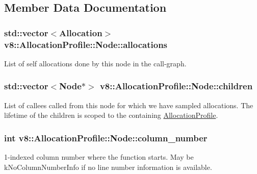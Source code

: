 \subsection{Member Data Documentation}
\subsubsection[{\texorpdfstring{allocations}{allocations}}]{\setlength{\rightskip}{0pt plus 5cm}std\+::vector$<${\bf Allocation}$>$ v8\+::\+Allocation\+Profile\+::\+Node\+::allocations}\hypertarget{structv8_1_1_allocation_profile_1_1_node_a6ee0934b35ba77fb5d8b53f02d5a3068}{}\label{structv8_1_1_allocation_profile_1_1_node_a6ee0934b35ba77fb5d8b53f02d5a3068}
List of self allocations done by this node in the call-\/graph. 
\subsubsection[{\texorpdfstring{children}{children}}]{\setlength{\rightskip}{0pt plus 5cm}std\+::vector$<${\bf Node}$\ast$$>$ v8\+::\+Allocation\+Profile\+::\+Node\+::children}\hypertarget{structv8_1_1_allocation_profile_1_1_node_a176673c0440cb1baaf7713e14da84db0}{}\label{structv8_1_1_allocation_profile_1_1_node_a176673c0440cb1baaf7713e14da84db0}
List of callees called from this node for which we have sampled allocations. The lifetime of the children is scoped to the containing \hyperlink{classv8_1_1_allocation_profile}{Allocation\+Profile}. 
\subsubsection[{\texorpdfstring{column\+\_\+number}{column_number}}]{\setlength{\rightskip}{0pt plus 5cm}int v8\+::\+Allocation\+Profile\+::\+Node\+::column\+\_\+number}\hypertarget{structv8_1_1_allocation_profile_1_1_node_a7cf86acc298428c858673fc1f9dbe305}{}\label{structv8_1_1_allocation_profile_1_1_node_a7cf86acc298428c858673fc1f9dbe305}
1-\/indexed column number where the function starts. May be k\+No\+Column\+Number\+Info if no line number information is available. 
